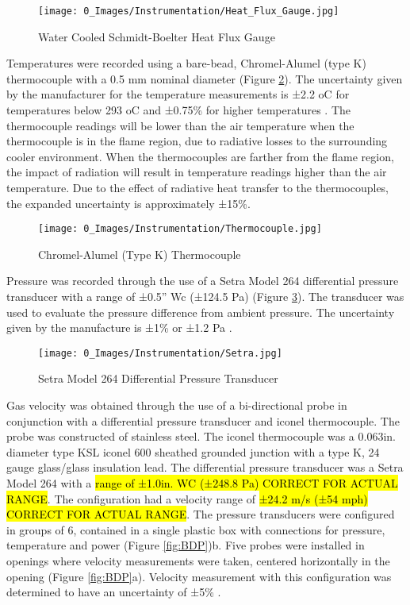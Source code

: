 \documentclass{article}
\begin{document}
\begin{figure} [H]
	\centering
	\texttt{[image: 0\_Images/Instrumentation/Heat\_Flux\_Gauge.jpg]}
	\caption{Water Cooled Schmidt-Boelter Heat Flux Gauge}
	\label{fig:HeatFluxGauge}
\end{figure}

Temperatures were recorded using a bare-bead, Chromel-Alumel (type K) thermocouple with a 0.5 mm nominal diameter (Figure \ref{fig:Thermocouple}). The uncertainty given by the manufacturer for the temperature measurements is ±2.2 oC for temperatures below 293 oC and ±0.75\% for higher temperatures \cite{TemperatureHandbook}. The thermocouple readings will be lower than the air temperature when the thermocouple is in the flame region, due to radiative losses to the surrounding cooler environment. When the thermocouples are farther from the flame region, the impact of radiation will result in temperature readings higher than the air temperature. Due to the effect of radiative heat transfer to the thermocouples, the expanded uncertainty is approximately ±15\%.

\begin{figure} [H]
	\centering
	\texttt{[image: 0\_Images/Instrumentation/Thermocouple.jpg]}
	\caption{Chromel-Alumel (Type K) Thermocouple}
	\label{fig:Thermocouple}
\end{figure}

Pressure was recorded through the use of a Setra Model 264 differential pressure transducer with a range of ±0.5” Wc (±124.5 Pa) (Figure \ref{fig:Setra}). The transducer was used to evaluate the pressure difference from ambient pressure. The uncertainty given by the manufacture is ±1\% or ±1.2 Pa \cite{SetraManual}.

\begin{figure} [H]
	\centering
	\texttt{[image: 0\_Images/Instrumentation/Setra.jpg]}
	\caption{Setra Model 264 Differential Pressure Transducer}
	\label{fig:Setra}
\end{figure}

Gas velocity was obtained through the use of a bi-directional probe in conjunction with a differential pressure transducer and iconel thermocouple. The probe was constructed of stainless steel. The iconel thermocouple was a 0.063in. diameter type KSL iconel 600 sheathed grounded junction with a type K, 24 gauge glass/glass insulation lead. The differential pressure transducer was a Setra Model 264 with a \hl{range of ±1.0in. WC (±248.8 Pa) CORRECT FOR ACTUAL RANGE}. The configuration had a velocity range of \hl{±24.2 m/s (±54 mph) CORRECT FOR ACTUAL RANGE}. The pressure transducers were configured in groups of 6, contained in a single plastic box with connections for pressure, temperature and power (Figure \ref{fig:BDP})b. Five probes were installed in openings where velocity measurements were taken, centered horizontally in the opening (Figure \ref{fig:BDP}a). Velocity measurement with this configuration was determined to have an uncertainty of ±5\% \cite{BDPInPoolFires}.
\end{document}
